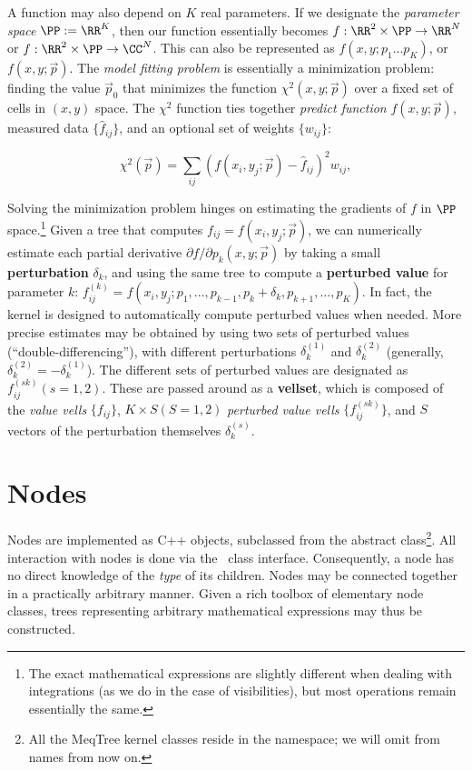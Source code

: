   A function may also depend on $K$ real parameters. If we designate the {\em
  parameter space} $\PP:=\RR^K$, then our function essentially becomes
  $f:\RR^2\times\PP\rightarrow\RR^N$ or $f:\RR^2\times\PP\rightarrow\CC^N$.
  This can also be represented as $f(x,y;p_1...p_K)$, or $f(x,y;\vec{p})$. The
  {\em model fitting problem} is essentially a minimization problem: finding
  the value $\vec{p}_0$  that minimizes the function $\chi^2(x,y;\vec{p})$ over
  a fixed set of cells in $(x,y)$ space. The $\chi^2$ function  ties together
  {\em predict function} $f(x,y;\vec{p})$, measured data $\{\hat{f}_{ij}\}$, and
  an optional set of weights $\{w_{ij}\}$:

  $$ \chi^2(\vec{p}) = \sum_{ij} (f(x_i,y_j;\vec{p}) - \hat{f}_{ij})^2w_{ij},$$
  
  Solving the minimization problem hinges on estimating the gradients of $f$ in
  $\PP$ space.\footnote{The exact mathematical expressions are slightly
  different when dealing with integrations (as we do in the case of
  visibilities), but most operations remain essentially the same.} Given a tree
  that computes $f_{ij}=f(x_i,y_j;\vec{p})$, we can numerically estimate each
  partial derivative ${\partial f}/{\partial p_k}(x,y;\vec{p})$ by taking a
  small {\bf perturbation} $\delta_k$, and using the same tree to compute a
  {\bf perturbed value} for parameter $k$: $f^{(k)}_{ij} =
  f(x_i,y_j;p_1,...,p_{k-1},p_k+\delta_k,p_{k+1},...,p_{K})$. In fact, the
  kernel is designed to automatically compute perturbed values when needed.
  More precise estimates may be obtained by using two sets of perturbed values
  (``double-differencing''), with different perturbations $\delta^{(1)}_k$ and
  $\delta^{(2)}_k$ (generally, $\delta^{(2)}_k = - \delta^{(1)}_k$). The
  different sets of perturbed values are designated as $f^{(sk)}_{ij} (s=1,2)$.
  These are passed around as a {\bf vellset}, which is composed of the {\em
  value vells} $\{f_{ij}\}$, $K\times S (S=1,2)$ {\em perturbed value vells}
  $\{f^{(sk)}_{ij}\}$, and $S$ vectors of  the perturbation themselves
  ${\delta^{(s)}_k}$.


\section{Nodes}

  Nodes are implemented as C++ objects, subclassed from the abstract
   class\footnote{All the MeqTree kernel classes reside in the
   namespace; we will omit  from names from now on.}. All
  interaction with nodes is done via the \Node\ class interface. Consequently, a
  node has no direct knowledge of the {\em type} of its children. Nodes may be
  connected together in a practically arbitrary manner. Given a rich toolbox of
  elementary node classes, trees representing arbitrary mathematical expressions
  may thus be constructed. 

